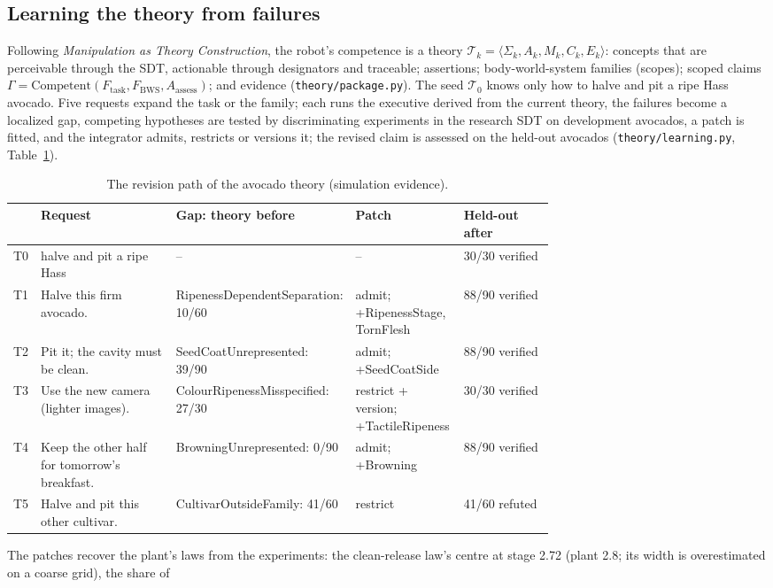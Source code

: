\documentclass[10.5pt,a4paper]{article}
\begin{document}
\subsection{Learning the theory from failures}
Following \emph{Manipulation as Theory Construction}, the robot's competence is a theory
$\mathcal{T}_k=\langle\Sigma_k,A_k,M_k,C_k,E_k\rangle$: concepts that are perceivable through the SDT, actionable through
designators and traceable; assertions; body-world-system families (scopes); scoped claims
$\Gamma=\mathrm{Competent}(F_\text{task},F_\text{BWS},A_\text{assess})$; and evidence (\texttt{theory/package.py}). The
seed $\mathcal{T}_0$ knows only how to halve and pit a ripe Hass avocado. Five requests expand the task or the family;
each runs the executive derived from the current theory, the failures become a localized gap, competing hypotheses are
tested by discriminating experiments in the research SDT on development avocados, a patch is fitted, and the
integrator admits, restricts or versions it; the revised claim is assessed on the held-out avocados
(\texttt{theory/learning.py}, Table~\ref{tab:revision}).
\begin{table}[htbp]\centering\scriptsize\caption{The revision path of the avocado theory (simulation evidence).\label{tab:revision}}
\begin{tabularx}{\linewidth}{@{}lp{0.25\linewidth}p{0.26\linewidth}p{0.2\linewidth}X@{}}\toprule  & Request & Gap: theory before & Patch & Held-out after \\\midrule
T0 & halve and pit a ripe Hass & -- & -- & 30/30 verified \\
T1 & Halve this firm avocado. & RipenessDependentSeparation: 10/60 & admit; +RipenessStage, TornFlesh & 88/90 verified \\
T2 & Pit it; the cavity must be clean. & SeedCoatUnrepresented: 39/90 & admit; +SeedCoatSide & 88/90 verified \\
T3 & Use the new camera (lighter images). & ColourRipenessMisspecified: 27/30 & restrict + version; +TactileRipeness & 30/30 verified \\
T4 & Keep the other half for tomorrow's breakfast. & BrowningUnrepresented: 0/90 & admit; +Browning & 88/90 verified \\
T5 & Halve and pit this other cultivar. & CultivarOutsideFamily: 41/60 & restrict & 41/60 refuted \\\bottomrule\end{tabularx}\end{table}
The patches recover the plant's laws from the experiments: the clean-release law's centre at stage 2.72 (plant 2.8; its width is overestimated on a coarse grid), the share of
\end{document}
